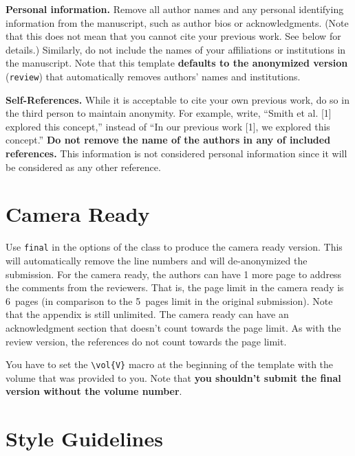 \documentclass[abstract]{nldl}
\begin{document}
\textbf{Personal information.}
Remove all author names and any personal identifying information from the manuscript, such as author bios or acknowledgments.
(Note that this does not mean that you cannot cite your previous work.
See below for details.)
Similarly, do not include the names of your affiliations or institutions in the manuscript.
Note that this template \textbf{defaults to the anonymized version} (\verb|review|) that automatically removes authors' names and institutions.

\textbf{Self-References.}
While it is acceptable to cite your own previous work, do so in the third person to maintain anonymity.
For example, write, ``Smith et al. [1] explored this concept,'' instead of ``In our previous work [1], we explored this concept.''
\textbf{Do not remove the name of the authors in any of included references.}
This information is not considered personal information since it will be considered as any other reference.

\section{Camera Ready}

Use \verb|final| in the options of the class to produce the camera ready version.
This will automatically remove the line numbers and will de-anonymized the submission.
For the camera ready, the authors can have 1 more page to address the comments from the reviewers.
That is, the page limit in the camera ready is 6~pages (in comparison to the 5~pages limit in the original submission).
Note that the appendix is still unlimited.
The camera ready can have an acknowledgment section that doesn't count towards the page limit.
As with the review version, the references do not count towards the page limit.

You have to set the \verb|\vol{V}| macro at the beginning of the template with the volume that was provided to you.
Note that \textbf{you shouldn't submit the final version without the volume number}.

\section{Style Guidelines}
\end{document}
